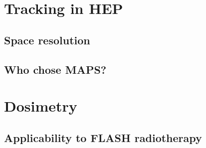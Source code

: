\section{Tracking in HEP}

\subsection{Space resolution}
\subsection{Who chose MAPS?}

\section{Dosimetry}
\subsection{Applicability to FLASH radiotherapy}